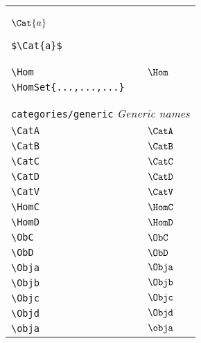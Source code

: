 \begin{longtable}{lll}
{{\begin{minipage}[]{5cm}
$\Cat{a}$\par%
{\footnotesize{\texttt{\$\textbackslash Cat\{a\}\$}}}\end{minipage}%
}%
}%
\\ 
 {\color[rgb]{0.5,0.5,0.5}\texttt{\textbackslash Hom}} & $\Hom$ & \\ 
 {\color[rgb]{0.5,0.5,0.5}\texttt{\textbackslash HomSet\{...,...,...\}}} &  & \\ 
  &  & {\setlength\fboxsep{1pt}%
\fbox{%
\color[rgb]{0.5,0.5,0.5}\begin{minipage}[]{5cm}%
$\HomSet{a}{b}{c}$\par%
{\footnotesize{\texttt{\$\textbackslash HomSet\{a\}\{b\}\{c\}\$}}}\end{minipage}%
}%
}%
\\ 
  &  & \\ 
 \multicolumn{3}{l}{{\color[rgb]{0.5,0.5,0.5}\texttt{categories/generic}} \emph{Generic names}}\\ 
 \hline
{\color[rgb]{0.5,0.5,0.5}\texttt{\textbackslash CatA}} & $\CatA$ & \\ 
 {\color[rgb]{0.5,0.5,0.5}\texttt{\textbackslash CatB}} & $\CatB$ & \\ 
 {\color[rgb]{0.5,0.5,0.5}\texttt{\textbackslash CatC}} & $\CatC$ & \\ 
 {\color[rgb]{0.5,0.5,0.5}\texttt{\textbackslash CatD}} & $\CatD$ & \\ 
 {\color[rgb]{0.5,0.5,0.5}\texttt{\textbackslash CatV}} & $\CatV$ & \\ 
 {\color[rgb]{0.5,0.5,0.5}\texttt{\textbackslash HomC}} & $\HomC$ & \\ 
 {\color[rgb]{0.5,0.5,0.5}\texttt{\textbackslash HomD}} & $\HomD$ & \\ 
 {\color[rgb]{0.5,0.5,0.5}\texttt{\textbackslash ObC}} & $\ObC$ & \\ 
 {\color[rgb]{0.5,0.5,0.5}\texttt{\textbackslash ObD}} & $\ObD$ & \\ 
 {\color[rgb]{0.5,0.5,0.5}\texttt{\textbackslash Obja}} & $\Obja$ & \\ 
 {\color[rgb]{0.5,0.5,0.5}\texttt{\textbackslash Objb}} & $\Objb$ & \\ 
 {\color[rgb]{0.5,0.5,0.5}\texttt{\textbackslash Objc}} & $\Objc$ & \\ 
 {\color[rgb]{0.5,0.5,0.5}\texttt{\textbackslash Objd}} & $\Objd$ & \\ 
 {\color[rgb]{0.5,0.5,0.5}\texttt{\textbackslash obja}} & $\obja$ & \\ 

\end{longtable}

